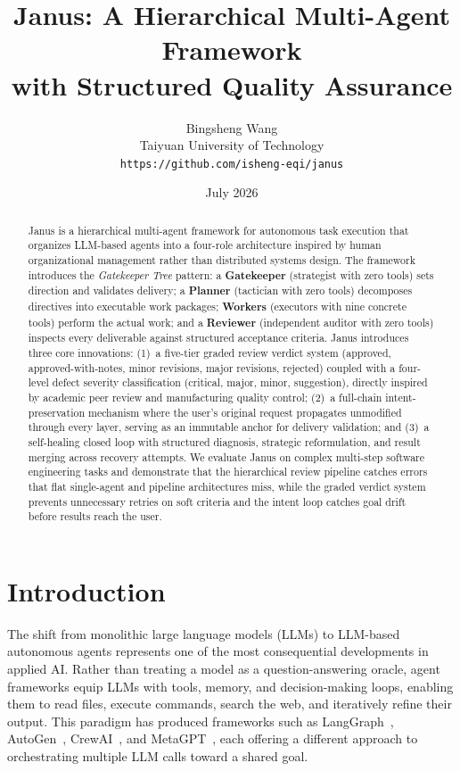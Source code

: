 \documentclass[11pt,a4paper]{article}
\title{\textbf{Janus: A Hierarchical Multi-Agent Framework\\[4pt]
        with Structured Quality Assurance}}
\author{%
    Bingsheng Wang\\
    Taiyuan University of Technology\\
    \texttt{https://github.com/isheng-eqi/janus}
}
\date{July 2026}
\begin{document}
\maketitle

\begin{abstract}
Janus is a hierarchical multi-agent framework for autonomous task execution
that organizes LLM-based agents into a four-role architecture inspired by human
organizational management rather than distributed systems design.
The framework introduces the \emph{Gatekeeper Tree} pattern:
a \textbf{Gatekeeper} (strategist with zero tools) sets direction and validates delivery;
a \textbf{Planner} (tactician with zero tools) decomposes directives into executable work packages;
\textbf{Workers} (executors with nine concrete tools) perform the actual work;
and a \textbf{Reviewer} (independent auditor with zero tools) inspects every
deliverable against structured acceptance criteria.
Janus introduces three core innovations: (1)~a five-tier graded review verdict
system (approved, approved-with-notes, minor revisions, major revisions,
rejected) coupled with a four-level defect severity classification (critical,
major, minor, suggestion), directly inspired by academic peer review and
manufacturing quality control; (2)~a full-chain intent-preservation mechanism
where the user's original request propagates unmodified through every layer,
serving as an immutable anchor for delivery validation; and (3)~a self-healing
closed loop with structured diagnosis, strategic reformulation, and result
merging across recovery attempts.
We evaluate Janus on complex multi-step software engineering tasks and
demonstrate that the hierarchical review pipeline catches errors that
flat single-agent and pipeline architectures miss, while the graded verdict
system prevents unnecessary retries on soft criteria and the intent loop
catches goal drift before results reach the user.
\end{abstract}

\section{Introduction}

The shift from monolithic large language models (LLMs) to LLM-based autonomous
agents represents one of the most consequential developments in applied AI.
Rather than treating a model as a question-answering oracle, agent frameworks
equip LLMs with tools, memory, and decision-making loops, enabling them to read
files, execute commands, search the web, and iteratively refine their output.
This paradigm has produced frameworks such as LangGraph~\cite{langgraph},
AutoGen~\cite{autogen}, CrewAI~\cite{crewai}, and MetaGPT~\cite{metagpt},
each offering a different approach to orchestrating multiple LLM calls toward
a shared goal.
\end{document}
